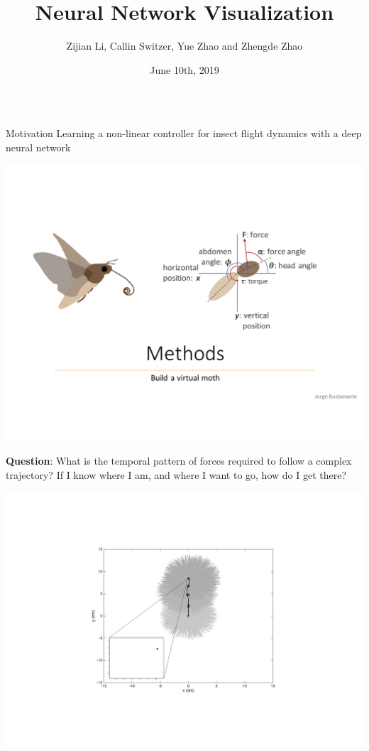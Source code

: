 \documentclass[final,hyperref={pdfpagelabels=false}]{beamer}
\title[NNV]{Neural Network Visualization}
\author{Zijian Li, Callin Switzer, Yue Zhao and Zhengde Zhao}
\institute{University of Washington}
\date{June 10th, 2019}
\begin{document}
  \begin{frame}{}

    \begin{columns}[t]
      \begin{column}{.32\linewidth}
        \begin{block}{Motivation}
 \noindent       Learning a non-linear controller for insect flight dynamics with a deep neural network
 \begin{center}
          \includegraphics[scale=0.9]{s1.pdf}
  \end{center}         
\noindent        \textbf{ Question}: What is the temporal pattern of forces required to follow a complex trajectory?  If I know where I am, and where I want to go, how do I get there?
\begin{center}
          \includegraphics[scale=1]{s3.pdf}

\end{center}
\end{block}
\end{column}
\end{columns}
\end{frame}
\end{document}
